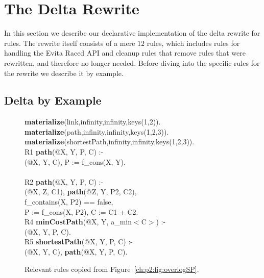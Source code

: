 \section{The Delta Rewrite}
\label{ch:evita:sec:delta}

In this section we describe our declarative implementation of the delta rewrite
for \OVERLOG rules.  The rewrite itself consists of a mere $12$ rules, which
includes rules for handling the Evita Raced API and cleanup rules that remove
rules that were rewritten, and therefore no longer needed. Before diving into
the specific rules for the rewrite we describe it by example.

\subsection{Delta by Example}

\begin{figure}[!t]
\ssp
\centering
\begin{boxedminipage}{\linewidth}
{\bf materialize}(link,infinity,infinity,keys(1,2)). \\
{\bf materialize}(path,infinity,infinity,keys(1,2,3)).  \\
{\bf materialize}(shortestPath,infinity,infinity,keys(1,2,3)). \\
  
R1 {\bf path}(@X, Y, P, C) :- \\
(@X, Y, C), P := f\_cons(X, Y). \\
\\
R2 {\bf path}(@X, Y, P, C) :- \\
(@X, Z, C1), {\bf path}(@Z, Y, P2, C2),\\
\datalogspace f\_contains(X, P2) == false, \\
\datalogspace P := f\_cons(X, P2), C := C1 + C2. \\

R4 {\bf minCostPath}(@X, Y, a\_min$<$C$>$) :-  \\
(@X, Y, P, C). \\ 

R5 {\bf shortestPath}(@X, Y, P, C) :- \\
(@X, Y, C), {\bf path}(@X, Y, P, C).

\end{boxedminipage}
\caption{\label{ch:evita:fig:basicSP}Relevant rules copied from Figure~\ref{ch:p2:fig:overlogSP}.}
\end{figure}

